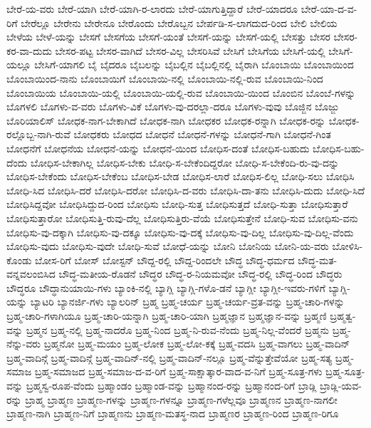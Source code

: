 {ಬೇರೆ-ಯ-ವರು
ಬೇರೆ-ಯಾಗಿ
ಬೇರೆ-ಯಾಗಿ-ರ-ಲಾರದು
ಬೇರೆ-ಯಾಗುತ್ತಿದ್ದಾರೆ
ಬೇರೆ-ಯಾದರೂ
ಬೇರೆ-ಯಾ-ದ-ವ-ರಿಗೆ
ಬೇರೆಲ್ಲೂ
ಬೇರೇನು
ಬೇರೇನೂ
ಬೇರೊಂದು
ಬೇರೊಬ್ಬನ
ಬೇರ್ಪಡಿ-ಸ-ಲಾಗದುದ-ರಿಂದ
ಬೇಲಿ
ಬೇಲಿಯ
ಬೇಳೆಯ
ಬೇಳೆ-ಯನ್ನು
ಬೇಸಗೆ
ಬೇಸಗೆಯ
ಬೇಸಗೆ-ಯಂತೆ
ಬೇಸಗೆ-ಯನ್ನು
ಬೇಸಗೆ-ಯಲ್ಲಿ
ಬೇಸತ್ತು
ಬೇಸರ
ಬೇಸರ-ಕರ-ವಾ-ದುದು
ಬೇಸರ-ಪಟ್ಟ
ಬೇಸರ-ವಾಗಿದೆ
ಬೇಸರ-ವಿಲ್ಲ
ಬೇಸರಿಸಿವೆ
ಬೇಸಿಗೆ
ಬೇಸಿಗೆಯ
ಬೇಸಿಗೆ-ಯಲ್ಲಿ
ಬೇಸಿಗೆ-ಯಲ್ಲೂ
ಬೇಸಿಗೆ-ಯಾಗಲಿ
ಬೈ
ಬೈದರೂ
ಬೈಬಲನ್ನು
ಬೈಬಲ್ಲಿನ
ಬೈಬಲ್ಲಿನಲ್ಲಿ
ಬೈರಾಗಿ
ಬೊಂಬಾಯಿ
ಬೊಂಬಾಯಿಂದ
ಬೊಂಬಾಯಿಂದ-ನಾನು
ಬೊಂಬಾಯಿಗೆ
ಬೊಂಬಾಯಿ-ನಲ್ಲಿ
ಬೊಂಬಾಯಿ-ನಲ್ಲಿ-ರುವ
ಬೊಂಬಾಯಿ-ನಿಂದ
ಬೊಂಬಾಯಿಯ
ಬೊಂಬಾಯಿ-ಯಲ್ಲಿ
ಬೊಂಬಾಯಿ-ಯಲ್ಲಿ-ರುವ
ಬೊಂಬಾಯಿ-ಯಿಂದ
ಬೊಂಬಿನ
ಬೊಂಬೆ-ಗಳನ್ನು
ಬೊಗಳಲಿ
ಬೊಗಳು-ವ-ವರು
ಬೊಗಳು-ವಿಕೆ
ಬೊಗಳು-ವು-ದರಲ್ಲಾ-ದರೂ
ಬೊಗಳು-ವುವು
ಬೊಜ್ಜಿನ
ಬೊಜ್ಜು
ಬೊರಿಯಾಲಿಸ್
ಬೋಧಕ-ನಾಗ-ಬೇಕಾಗಿದೆ
ಬೋಧಕ-ನಾಗಿ
ಬೋಧಕರ
ಬೋಧಕ-ರನ್ನಾಗಿ
ಬೋಧಕ-ರನ್ನು
ಬೋಧಕ-ರಲ್ಲೊಬ್ಬ-ನಾಗಿ-ರುವೆ
ಬೋಧಕರು
ಬೋಧದ
ಬೋಧನೆ
ಬೋಧನೆ-ಗಳನ್ನು
ಬೋಧನೆ-ಗಾಗಿ
ಬೋಧನೆ-ಗಿಂತ
ಬೋಧನೆಗೆ
ಬೋಧನೆಯ
ಬೋಧನೆ-ಯನ್ನು
ಬೋಧನೆ-ಯಿಂದ
ಬೋಧಿಸ-ದಂತೆ
ಬೋಧಿಸ-ಬಹುದು
ಬೋಧಿಸ-ಬಹು-ದೆಂದು
ಬೋಧಿಸ-ಬೇಕಾಗಿಲ್ಲ
ಬೋಧಿಸ-ಬೇಕು
ಬೋಧಿ-ಸ-ಬೇಕೆಂದಿದ್ದರೋ
ಬೋಧಿ-ಸ-ಬೇಕೆಂದಿ-ರು-ವು-ದನ್ನು
ಬೋಧಿಸ-ಬೇಕೆಂದು
ಬೋಧಿಸ-ಬೇಕೆಂಬ
ಬೋಧಿಸ-ಬೇಡ
ಬೋಧಿಸ-ಲಾರೆ
ಬೋಧಿಸ-ಲಿಲ್ಲ
ಬೋಧಿ-ಸಲು
ಬೋಧಿಸಿ
ಬೋಧಿ-ಸಿದ
ಬೋಧಿಸಿ-ದರೆ
ಬೋಧಿಸಿ-ದರೋ
ಬೋಧಿಸಿ-ದ-ವರು
ಬೋಧಿಸಿ-ದಾ-ತನು
ಬೋಧಿಸಿ-ದುದು
ಬೋಧಿ-ಸಿದೆ
ಬೋಧಿಸಿದ್ದವೋ
ಬೋಧಿಸಿದ್ದುದ-ರಿಂದ
ಬೋಧಿಸು
ಬೋಧಿ-ಸುತ್ತ
ಬೋಧಿಸುತ್ತದೆ
ಬೋಧಿ-ಸುತ್ತಾ
ಬೋಧಿಸುತ್ತಾರೆ
ಬೋಧಿಸುತ್ತಾರೋ
ಬೋಧಿಸುತ್ತಿ-ರುವು-ದೆಲ್ಲ
ಬೋಧಿಸುತ್ತಿರು-ವೆಯೆ
ಬೋಧಿಸುತ್ತೇನೆ
ಬೋಧಿ-ಸುವ
ಬೋಧಿಸು-ವನು
ಬೋಧಿಸು-ವು-ದಕ್ಕಾಗಿ
ಬೋಧಿಸು-ವು-ದಕ್ಕೂ
ಬೋಧಿಸು-ವು-ದಕ್ಕೆ
ಬೋಧಿಸು-ವು-ದಿಲ್ಲ
ಬೋಧಿಸು-ವು-ದಿಲ್ಲ-ವೆಂದು
ಬೋಧಿಸು-ವುದು
ಬೋಧಿಸು-ವುದೇ
ಬೋಧಿ-ಸುವೆ
ಬೋಧೆ-ಯನ್ನು
ಬೋನಿ
ಬೋನಿಯ
ಬೋನಿ-ಯ-ವರು
ಬೋಳಿಸಿ-ಕೊಂಡು
ಬೋಸ-ರಿಗೆ
ಬೋಸ್
ಬೋಸ್ಟನ್
ಬೌದ್ದ-ರಲ್ಲಿ
ಬೌದ್ದ-ರಿಂದಲೇ
ಬೌದ್ಧ
ಬೌದ್ಧ-ಧರ್ಮದ
ಬೌದ್ಧ-ಮತ-ವನ್ನವಲಂಬಿಸಿದ
ಬೌದ್ಧ-ಮತೀಯ-ರೊಡನೆ
ಬೌದ್ಧರ
ಬೌದ್ಧ-ರ-ನಿಯಮವೋ
ಬೌದ್ಧ-ರಲ್ಲಿ
ಬೌದ್ಧ-ರಿಂದ
ಬೌದ್ಧರು
ಬೌದ್ಧರೂ
ಬೌದ್ಧಾನುಯಾಯಿ-ಗಳು
ಬ್ಯಾಂಕಿ-ನಲ್ಲಿ
ಬ್ಯಾಗ್ಲಿ
ಬ್ಯಾಗ್ಲಿ-ಗಳೊ-ಡನೆ
ಬ್ಯಾಗ್ಲೀ
ಬ್ಯಾಗ್ಲೀ-ಇವರು-ಗಳಿಗೆ
ಬ್ಯಾಗ್ಲಿ-ಯನ್ನು
ಬ್ಯಾಟರಿ
ಬ್ಯಾನರ್ಜಿ-ಗಳು
ಬ್ಯಾಲರಿನ್
ಬ್ರಹ್ಮ
ಬ್ರಹ್ಮ-ಚರ್ಯ
ಬ್ರಹ್ಮ-ಚರ್ಯ-ವ್ರತ-ವನ್ನು
ಬ್ರಹ್ಮ-ಚಾರಿ-ಗಳನ್ನು
ಬ್ರಹ್ಮ-ಚಾರಿ-ಗಳಾಗಿಯೂ
ಬ್ರಹ್ಮ-ಚಾರಿ-ಯನ್ನಾಗಿ
ಬ್ರಹ್ಮ-ಚಾರಿ-ಯಾಗಿ
ಬ್ರಹ್ಮಜ್ಞಾನ
ಬ್ರಹ್ಮಜ್ಞಾನ-ವನ್ನು
ಬ್ರಹ್ಮಣಿ
ಬ್ರಹ್ಮತ್ವ-ವನ್ನು
ಬ್ರಹ್ಮನ
ಬ್ರಹ್ಮ-ನಲ್ಲಿ
ಬ್ರಹ್ಮ-ನಾದರೊ
ಬ್ರಹ್ಮ-ನಿಂದ
ಬ್ರಹ್ಮ-ನಿ-ರುವ-ನೆಂದು
ಬ್ರಹ್ಮ-ನಿಲ್ಲ-ವೆಂದರೆ
ಬ್ರಹ್ಮನು
ಬ್ರಹ್ಮ-ನೆನ್ನು-ವರು
ಬ್ರಹ್ಮನೋ
ಬ್ರಹ್ಮ-ಮಯಂ
ಬ್ರಹ್ಮ-ಲೋಕ
ಬ್ರಹ್ಮ-ಲೋ-ಕಕ್ಕೆ
ಬ್ರಹ್ಮ-ವದಸಿ
ಬ್ರಹ್ಮ-ವಾಗಲು
ಬ್ರಹ್ಮ-ವಾದಿನ್
ಬ್ರಹ್ಮ-ವಾದಿನ್ಗೆ
ಬ್ರಹ್ಮ-ವಾದಿನ್ಗೆ
ಬ್ರಹ್ಮ-ವಾದಿನ್-ನಲ್ಲಿ
ಬ್ರಹ್ಮ-ವಾದಿನ್-ನಲ್ಲೂ
ಬ್ರಹ್ಮ-ವೆನ್ನುತ್ತೇವೆಯೋ
ಬ್ರಹ್ಮ-ಸತ್ಯ
ಬ್ರಹ್ಮ-ಸಮಾಜ
ಬ್ರಹ್ಮ-ಸಮಾಜದ
ಬ್ರಹ್ಮ-ಸಮಾಜ-ದ-ವ-ರಿಗೆ
ಬ್ರಹ್ಮ-ಸಾಕ್ಷಾತ್ಕಾರ-ವಾದ-ವ-ನಿಗೆ
ಬ್ರಹ್ಮ-ಸೂತ್ರ-ಗಳು
ಬ್ರಹ್ಮ-ಸೂತ್ರ-ವನ್ನು
ಬ್ರಹ್ಮಸ್ವ-ರೂಪ-ವೆಂದು
ಬ್ರಹ್ಮಾಂಡಂ
ಬ್ರಹ್ಮಾಂಡ-ವನ್ನು
ಬ್ರಹ್ಮಾನಂದ-ರನ್ನು
ಬ್ರಹ್ಮಾನಂದ-ರಿಗೆ
ಬ್ರಾಡ್ಲಿ
ಬ್ರಾಡ್ಲಿ-ಯವ-ರನ್ನು
ಬ್ರಾಹ್ಮ
ಬ್ರಾಹ್ಮಣ
ಬ್ರಾಹ್ಮಣ-ಗಳನ್ನು
ಬ್ರಾಹ್ಮಣ-ಗಳನ್ನೂ
ಬ್ರಾಹ್ಮಣ-ಗಳೆಲ್ಲವೂ
ಬ್ರಾಹ್ಮಣನ
ಬ್ರಾಹ್ಮಣ-ನಾಗಲೀ
ಬ್ರಾಹ್ಮಣ-ನಾಗಿ
ಬ್ರಾಹ್ಮಣ-ನಿಗೆ
ಬ್ರಾಹ್ಮಣನು
ಬ್ರಾಹ್ಮಣ-ಮತಸ್ಥ-ನಾದ
ಬ್ರಾಹ್ಮಣರ
ಬ್ರಾಹ್ಮಣ-ರಿಂದ
ಬ್ರಾಹ್ಮಣ-ರಿಗೂ
}
